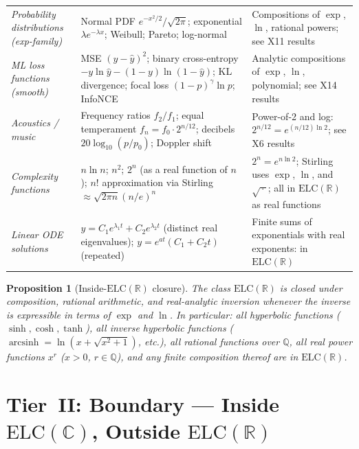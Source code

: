 \documentclass[12pt,a4paper]{article}
\newtheorem{proposition}[theorem]{Proposition}
\theoremstyle{definition}
\newcommand{\ELC}{\mathrm{ELC}(\mathbb{R})}
\newcommand{\ELCcx}{\mathrm{ELC}(\mathbb{C})}
\newcommand{\Q}{\mathbb{Q}}
\begin{document}
\begin{longtable}{@{}p{4.2cm}p{4.8cm}p{5.3cm}@{}}
\textit{Probability distributions (exp-family)} &
Normal PDF $e^{-x^2/2}/\sqrt{2\pi}$; exponential $\lambda e^{-\lambda x}$;
Weibull; Pareto; log-normal &
Compositions of $\exp$, $\ln$, rational powers; see X11 results \\[4pt]
\textit{ML loss functions (smooth)} &
MSE $(y-\hat y)^2$; binary cross-entropy $-y\ln\hat y-(1-y)\ln(1-\hat y)$;
KL divergence; focal loss $(1-p)^\gamma\ln p$; InfoNCE &
Analytic compositions of $\exp$, $\ln$, polynomial; see X14 results \\[4pt]
\textit{Acoustics / music} &
Frequency ratios $f_2/f_1$; equal temperament $f_n = f_0\cdot 2^{n/12}$;
decibels $20\log_{10}(p/p_0)$; Doppler shift &
Power-of-2 and log: $2^{n/12}=e^{(n/12)\ln 2}$; see X6 results \\[4pt]
\textit{Complexity functions} &
$n\ln n$; $n^2$; $2^n$ (as a real function of $n$); $n!$ approximation
via Stirling $\approx \sqrt{2\pi n}(n/e)^n$ &
$2^n=e^{n\ln 2}$; Stirling uses $\exp$, $\ln$, and $\sqrt{\,\cdot\,}$;
all in $\ELC$ as real functions \\[4pt]
\textit{Linear ODE solutions} &
$y=C_1 e^{\lambda_1 t}+C_2 e^{\lambda_2 t}$ (distinct real eigenvalues);
$y=e^{at}(C_1+C_2 t)$ (repeated) &
Finite sums of exponentials with real exponents: in $\ELC$ \\
\end{longtable}

\begin{proposition}[Inside-$\ELC$ closure]
\label{prop:inside}
The class $\ELC$ is closed under composition, rational arithmetic, and
real-analytic inversion whenever the inverse is expressible in terms of
$\exp$ and $\ln$.  In particular: all hyperbolic functions
($\sinh, \cosh, \tanh$), all inverse hyperbolic functions
($\operatorname{arcsinh}=\ln(x+\sqrt{x^2+1})$, etc.), all rational functions
over $\Q$, all real power functions $x^r$ ($x>0$, $r\in\Q$), and any
finite composition thereof are in $\ELC$.
\end{proposition}

\section{Tier~II: Boundary --- Inside \texorpdfstring{$\ELCcx$}{ELC(C)}, Outside \texorpdfstring{$\ELC$}{ELC(R)}}
\label{sec:boundary}
\end{document}
